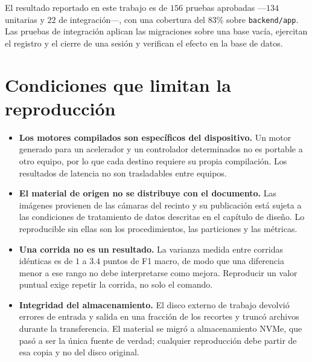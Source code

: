 El resultado reportado en este trabajo es de $156$ pruebas aprobadas ---$134$
unitarias y $22$ de integración---, con una cobertura del $83\%$ sobre
\texttt{backend/app}. Las pruebas de integración aplican las migraciones sobre una
base vacía, ejercitan el registro y el cierre de una sesión y verifican el efecto
en la base de datos.

\section{Condiciones que limitan la reproducción}

\begin{itemize}
    \item \textbf{Los motores compilados son específicos del dispositivo.} Un
        motor generado para un acelerador y un controlador determinados no es
        portable a otro equipo, por lo que cada destino requiere su propia
        compilación. Los resultados de latencia no son trasladables entre equipos.
    \item \textbf{El material de origen no se distribuye con el documento.} Las
        imágenes provienen de las cámaras del recinto y su publicación está sujeta
        a las condiciones de tratamiento de datos descritas en el capítulo de
        diseño. Lo reproducible sin ellas son los procedimientos, las particiones
        y las métricas.
    \item \textbf{Una corrida no es un resultado.} La varianza medida entre
        corridas idénticas es de $1$ a $3{.}4$ puntos de F1 macro, de modo que una
        diferencia menor a ese rango no debe interpretarse como mejora. Reproducir
        un valor puntual exige repetir la corrida, no solo el comando.
    \item \textbf{Integridad del almacenamiento.} El disco externo
        de trabajo devolvió errores de entrada y salida en una fracción de los
        recortes y truncó archivos durante la transferencia. El material se migró
        a almacenamiento NVMe, que pasó a ser la única fuente de verdad; cualquier
        reproducción debe partir de esa copia y no del disco original.
\end{itemize}
